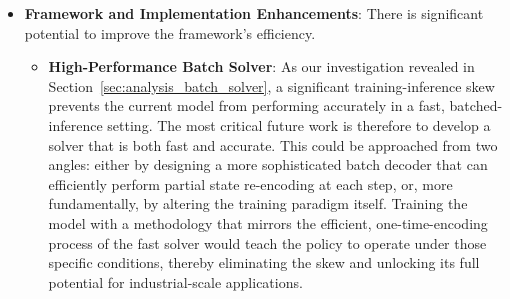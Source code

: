 \begin{itemize}
    \item \textbf{Framework and Implementation Enhancements}:
    There is significant potential to improve the framework's efficiency.
        \begin{itemize}
            \item \textbf{High-Performance Batch Solver}: As our investigation revealed in Section~\ref{sec:analysis_batch_solver}, a significant training-inference skew prevents the current model from performing accurately in a fast, batched-inference setting. The most critical future work is therefore to develop a solver that is both fast and accurate. This could be approached from two angles: either by designing a more sophisticated batch decoder that can efficiently perform partial state re-encoding at each step, or, more fundamentally, by altering the training paradigm itself. Training the model with a methodology that mirrors the efficient, one-time-encoding process of the fast solver would teach the policy to operate under those specific conditions, thereby eliminating the skew and unlocking its full potential for industrial-scale applications.
        \end{itemize}
\end{itemize}